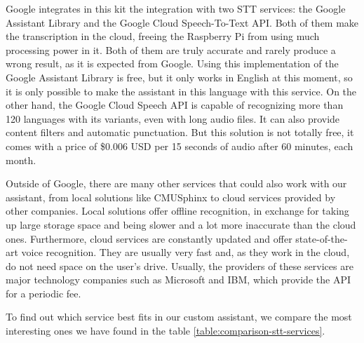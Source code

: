 Google integrates in this kit the integration with two STT services: the Google Assistant Library and the Google Cloud
Speech-To-Text API\cite{googleCloudSttWebsite}. Both of them make the transcription in the cloud, freeing the Raspberry Pi from
using much processing power in it. Both of them are truly accurate and rarely produce a wrong result, as it is expected from Google.
Using this implementation of the Google Assistant Library is free, but it only works in English at this moment, so it is only
possible to make the assistant in this language with this service. On the other hand, the Google Cloud Speech API is capable of
recognizing more than 120 languages with its variants, even with long audio files. It can also provide content filters and automatic
punctuation. But this solution is not totally free, it comes with a price of \$0.006 USD per 15 seconds of audio after 60 minutes,
each month.\cite{craftworkzBlog}\cite{globalmeBlog}

Outside of Google, there are many other services that could also work with our assistant, from local solutions like
CMUSphinx\cite{cmusphinxWiki} to cloud services provided by other companies. Local solutions offer offline recognition, in
exchange for taking up large storage space and being slower and a lot more inaccurate than the cloud ones. Furthermore,
cloud services are constantly updated and offer state-of-the-art voice recognition. They are usually very fast and, as they work
in the cloud, do not need space on the user's drive. Usually, the providers of these services are major technology companies
such as Microsoft and IBM\cite{ibmWatsonSttWebsite}, which provide the API for a periodic fee.

To find out which service best fits in our custom assistant, we compare the most interesting ones we have found in the table
\ref{table:comparison-stt-services}.

